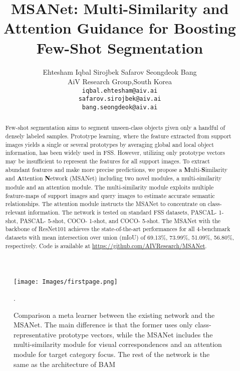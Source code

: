 \documentclass[10pt,twocolumn,letterpaper]{article}
\begin{document}
\title{MSANet: Multi-Similarity and Attention Guidance for Boosting Few-Shot Segmentation}

\author{Ehtesham Iqbal  \qquad Sirojbek Safarov \qquad Seongdeok Bang \\
AiV Research Group,\;South Korea\\
{\tt\small iqbal.ehtesham@aiv.ai}\\
{\tt\small safarov.sirojbek@aiv.ai}\\
{\tt\small bang.seongdeok@aiv.ai}}


\maketitle
\begin{NoHyper}
\def\thefootnote{*}
\def\thefootnote{}
\end{NoHyper}
\def\thefootnote{\arabic{footnote}}
\begin{abstract}
Few-shot segmentation aims to segment unseen-class objects given only a handful of densely labeled samples. Prototype learning, where the feature extracted from support images yields a single or several prototypes by averaging global and local object information, has been widely used in FSS. However, utilizing only prototype vectors may be insufficient to represent the features for all support images. To extract abundant features and make more precise predictions, we propose a \textbf{M}ulti-\textbf{S}imilarity and \textbf{A}ttention \textbf{N}etwork (MSANet) including two novel modules, a multi-similarity module and an attention module. The multi-similarity module exploits multiple feature-maps of support images and query images to estimate accurate semantic relationships. The attention module instructs the MSANet to concentrate on class-relevant information. The network is tested on standard FSS datasets, PASCAL- 1-shot, PASCAL- 5-shot, COCO- 1-shot, and COCO- 5-shot. The MSANet with the backbone of ResNet101 achieves the state-of-the-art performances for all 4-benchmark datasets with mean intersection over union (mIoU) of 69.13\%, 73.99\%, 51.09\%, 56.80\%, respectively. Code is available at \url{https://github.com/AIVResearch/MSANet}. 
\end{abstract}
\begin{figure}[t]
  \centering
\texttt{[image: Images/firstpage.png]}
\caption{Comparison a meta learner between the existing network and the MSANet. The main difference is that the former uses only class-representative prototype vectors, while the MSANet includes the multi-similarity module for visual correspondences and an attention module for target category focus. The rest of the network is the same as the architecture of BAM \cite{BAM}}.
\label{fig:first}
\end{figure} 
\end{document}
